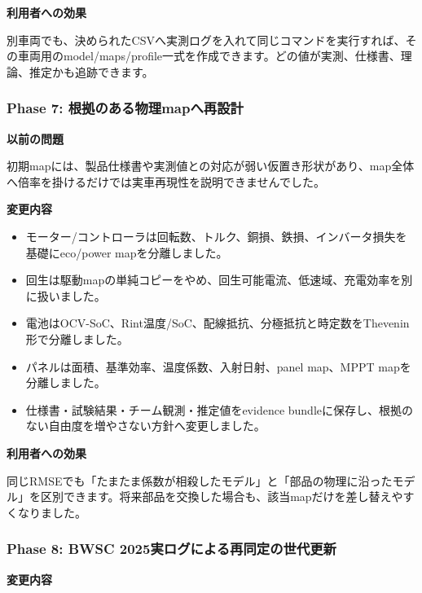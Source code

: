 \documentclass[
  japanese,
  a4paper,
  11pt]{article}
\providecommand{\tightlist}{%
  \setlength{\itemsep}{0pt}\setlength{\parskip}{0pt}}
\begin{document}
\textbf{利用者への効果}

別車両でも、決められたCSVへ実測ログを入れて同じコマンドを実行すれば、その車両用のmodel/maps/profile一式を作成できます。どの値が実測、仕様書、理論、推定かも追跡できます。

\subsubsection{Phase 7:
根拠のある物理mapへ再設計}\label{phase-7-ux6839ux62e0ux306eux3042ux308bux7269ux7406mapux3078ux518dux8a2dux8a08}

\textbf{以前の問題}

初期mapには、製品仕様書や実測値との対応が弱い仮置き形状があり、map全体へ倍率を掛けるだけでは実車再現性を説明できませんでした。

\textbf{変更内容}

\begin{itemize}
\tightlist
\item
  モーター/コントローラは回転数、トルク、銅損、鉄損、インバータ損失を基礎にeco/power
  mapを分離しました。
\item
  回生は駆動mapの単純コピーをやめ、回生可能電流、低速域、充電効率を別に扱いました。
\item
  電池はOCV-SoC、Rint温度/SoC、配線抵抗、分極抵抗と時定数をThevenin形で分離しました。
\item
  パネルは面積、基準効率、温度係数、入射日射、panel map、MPPT
  mapを分離しました。
\item
  仕様書・試験結果・チーム観測・推定値をevidence
  bundleに保存し、根拠のない自由度を増やさない方針へ変更しました。
\end{itemize}

\textbf{利用者への効果}

同じRMSEでも「たまたま係数が相殺したモデル」と「部品の物理に沿ったモデル」を区別できます。将来部品を交換した場合も、該当mapだけを差し替えやすくなりました。

\subsubsection{Phase 8: BWSC
2025実ログによる再同定の世代更新}\label{phase-8-bwsc-2025ux5b9fux30edux30b0ux306bux3088ux308bux518dux540cux5b9aux306eux4e16ux4ee3ux66f4ux65b0}

\textbf{変更内容}
\end{document}
